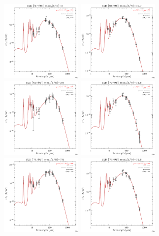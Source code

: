 \documentclass[preprint2,longabstract]{aastex}
\begin{document}
\begin{figure}
    \includegraphics[trim=0 2mm 0 0, clip, width=40mm]{SEDs/sed_67.pdf}
	\includegraphics[trim=0 2mm 0 0, clip, width=40mm]{SEDs/sed_68.pdf}
	\includegraphics[trim=0 2mm 0 0, clip, width=40mm]{SEDs/sed_69.pdf}
	\includegraphics[trim=0 2mm 0 0, clip, width=40mm]{SEDs/sed_70.pdf}
	\includegraphics[trim=0 2mm 0 0, clip, width=40mm]{SEDs/sed_71.pdf}
	\includegraphics[trim=0 2mm 0 0, clip, width=40mm]{SEDs/sed_72.pdf}

\end{figure}
\end{document}
